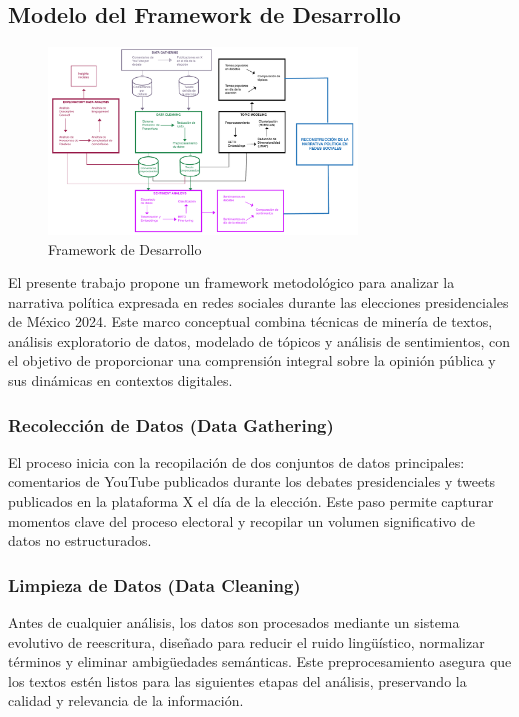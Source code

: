 \documentclass[10pt, a4paper]{article}
\begin{document}
	
	\subsection{Modelo del Framework de Desarrollo}
	
	\begin{figure}[H] %
		\centering
		\includegraphics[width=0.73\textwidth]{diagrama.pdf} %
		\caption{Framework de Desarrollo} %
		\label{fig:framework} %
	\end{figure}
	
	El presente trabajo propone un framework metodológico para analizar la narrativa política expresada en redes sociales durante las elecciones presidenciales de México 2024. Este marco conceptual combina técnicas de minería de textos, análisis exploratorio de datos, modelado de tópicos y análisis de sentimientos, con el objetivo de proporcionar una comprensión integral sobre la opinión pública y sus dinámicas en contextos digitales.
	
	
	\subsubsection{Recolección de Datos (Data Gathering)}
	El proceso inicia con la recopilación de dos conjuntos de datos principales: comentarios de YouTube publicados durante los debates presidenciales y tweets publicados en la plataforma X el día de la elección. Este paso permite capturar momentos clave del proceso electoral y recopilar un volumen significativo de datos no estructurados.
	
	\subsubsection{Limpieza de Datos (Data Cleaning)}
	Antes de cualquier análisis, los datos son procesados mediante un sistema evolutivo de reescritura, diseñado para reducir el ruido lingüístico, normalizar términos y eliminar ambigüedades semánticas. Este preprocesamiento asegura que los textos estén listos para las siguientes etapas del análisis, preservando la calidad y relevancia de la información.
	
\end{document}
